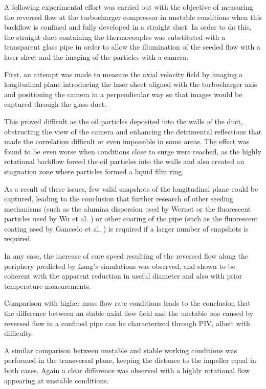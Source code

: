 A following experimental effort was carried out with the objective of measuring the reversed flow at the turbocharger compressor in unstable conditions when this backflow is confined and fully developed in a straight duct. In order to do this, the straight duct containing the thermocouples was substituted with a transparent glass pipe in order to allow the illumination of the seeded flow with a laser sheet and the imaging of the particles with a camera.

First, an attempt was made to measure the axial velocity field by imaging a longitudinal plane introducing the laser sheet aligned with the turbocharger axis and positioning the camera in a perpendicular way so that images would be captured through the glass duct.

This proved difficult as the oil particles deposited into the walls of the duct, obstructing the view of the camera and enhancing the detrimental reflections that made the correlation difficult or even impossible in some areas. The effect was found to be even worse when conditions close to surge were reached, as the highly rotational backflow forced the oil particles into the walls and also created an stagnation zone where particles formed a liquid film ring.

As a result of these issues, few valid snapshots of the longitudinal plane could be captured, leading to the conclusion that further research of other seeding mechanisms (such as the alumina dispersion used by Wernet \cite{wernet2000development} or the fluorescent particles used by Wu et al. \cite{wu2011piv}) or other coating of the pipe (such as the fluorescent coating used by Gancedo et al. \cite{gancedo2016piv}) is required if a larger number of snapshots is required.

In any case, the increase of core speed resulting of the reversed flow along the periphery predicted by Lang's simulations \cite{lang2011contribucion} was observed, and shown to be coherent with the apparent reduction in useful diameter and also with prior temperature measurements.

Comparison with higher mass flow rate conditions leads to the conclusion that the difference between an stable axial flow field and the unstable one caused by reversed flow in a confined pipe can be characterized through PIV, albeit with difficulty.

A similar comparison between unstable and stable working conditions was performed in the transversal plane, keeping the distance to the impeller equal in both cases. Again a clear difference was observed with a highly rotational flow appearing at unstable conditions.


